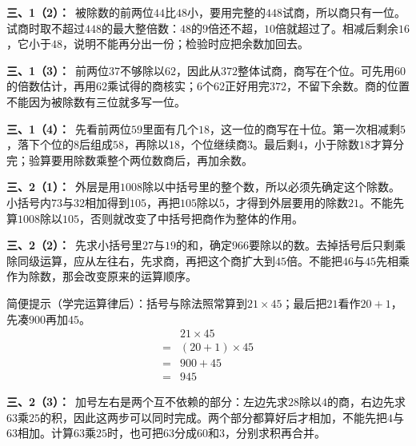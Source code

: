 \documentclass[multi=snippet,border=0pt]{standalone}
\newenvironment{snippet}[3]{\begin{minipage}{#1bp}\color{answerred}\fontsize{#2}{#3}\selectfont\raggedright}{\end{minipage}}
\begin{document}
\begin{snippet}{505}{11.5}{14}\textbf{三、1（2）：}\ 被除数的前两位\(44\)比\(48\)小，要用完整的\(448\)试商，所以商只有一位。试商时取不超过\(448\)的最大整倍数：\(48\)的\(9\)倍还不超，\(10\)倍就超过了。相减后剩余\(16\)，它小于\(48\)，说明不能再分出一份；检验时应把余数加回去。\end{snippet}
\begin{snippet}{505}{11.5}{14}\textbf{三、1（3）：}\ 前两位\(37\)不够除以\(62\)，因此从\(372\)整体试商，商写在个位。可先用\(60\)的倍数估计，再用\(62\)乘试得的商核实；\(6\)个\(62\)正好用完\(372\)，不留下余数。商的位置不能因为被除数有三位就多写一位。\end{snippet}
\begin{snippet}{505}{11.5}{14}\textbf{三、1（4）：}\ 先看前两位\(59\)里面有几个\(18\)，这一位的商写在十位。第一次相减剩\(5\)，落下个位的\(8\)后组成\(58\)，再除以\(18\)，个位继续商\(3\)。最后剩\(4\)，小于除数\(18\)才算分完；验算要用除数乘整个两位数商后，再加余数。\end{snippet}
\begin{snippet}{505}{11.5}{14}\textbf{三、2（1）：}\ 外层是用\(1008\)除以中括号里的整个数，所以必须先确定这个除数。小括号内\(73\)与\(32\)相加得到\(105\)，再把\(105\)除以\(5\)，才得到外层要用的除数\(21\)。不能先算\(1008\)除以\(105\)，否则就改变了中括号把商作为整体的作用。\end{snippet}
\begin{snippet}{505}{11.5}{14}\textbf{三、2（2）：}\ 先求小括号里\(27\)与\(19\)的和，确定\(966\)要除以的数。去掉括号后只剩乘除同级运算，应从左往右，先求商，再把这个商扩大到\(45\)倍。不能把\(46\)与\(45\)先相乘作为除数，那会改变原来的运算顺序。\par 简便提示（学完运算律后）：括号与除法照常算到\(21\times45\)；最后把\(21\)看作\(20+1\)，先凑\(900\)再加\(45\)。\[\begin{aligned}&21\times45\\={}&(20+1)\times45\\={}&900+45\\={}&945\end{aligned}\]\end{snippet}
\begin{snippet}{505}{11.5}{14}\textbf{三、2（3）：}\ 加号左右是两个互不依赖的部分：左边先求\(28\)除以\(4\)的商，右边先求\(63\)乘\(25\)的积，因此这两步可以同时完成。两个部分都算好后才相加，不能先把\(4\)与\(63\)相加。计算\(63\)乘\(25\)时，也可把\(63\)分成\(60\)和\(3\)，分别求积再合并。\end{snippet}
\end{document}
